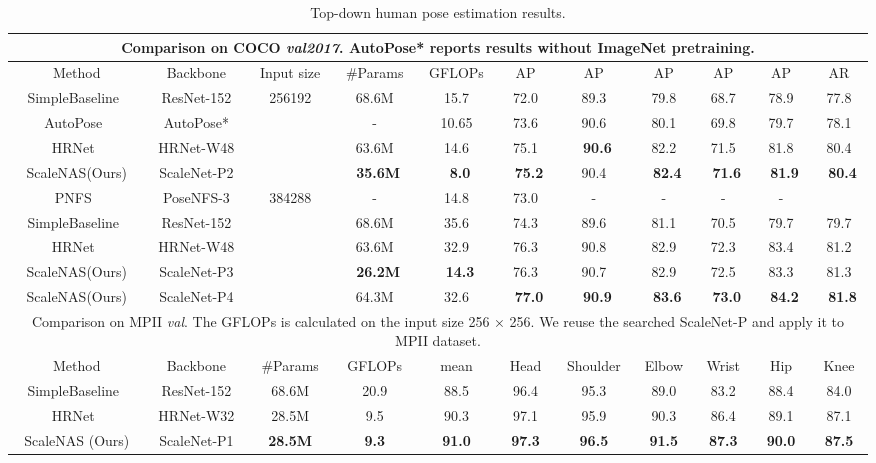 \documentclass[final]{cvpr}
\newcommand{\workname}{ScaleNAS\xspace}
\newcommand{\netname}{ScaleNet\xspace}
\begin{document}
\begin{table*}
\centering
\caption{Top-down human pose estimation results.
}
\small
\begin{tabular}{c||c|c|c|c|c|c|c|c|c|c} 
\hline
\multicolumn{11}{c}{\footnotesize{Comparison on COCO \textit{val2017}. AutoPose* reports results without ImageNet pretraining.}} \\
\hline
Method & Backbone & Input size  & \#Params & GFLOPs & AP & AP  & AP  & AP  & AP  & AR \\ 
\hline 
SimpleBaseline~\cite{xiao2018simple}  & ResNet-152       & \multirow{4}{*}{256192} & 68.6M    & 15.7   & 72.0 & 89.3      & 79.8      & 68.7     & 78.9     & 77.8 \\
AutoPose~\cite{gong2020autopose}   & AutoPose*       &  & -    & 10.65   & 73.6 & 90.6      & 80.1      & 69.8     & 79.7     & 78.1 \\
HRNet~\cite{wang2020deep}           & HRNet-W48        &  & 63.6M    & 14.6   & 75.1 & ~\textbf{90.6}      & 82.2      & 71.5     & 81.8     & 80.4 \\
\workname(Ours) & \netname-P2  &  & ~\textbf{35.6M}    & ~\textbf{8.0}    & ~\textbf{75.2} & 90.4      & ~\textbf{82.4}      & ~\textbf{71.6}     & ~\textbf{81.9}     & ~\textbf{80.4} \\
\hline
PNFS~\cite{yang2019pose}   & PoseNFS-3       & \multirow{5}{*}{384288} & -    & 14.8    & 73.0 & -      & -      & -     & -    &  \\
SimpleBaseline~\cite{xiao2018simple}  & ResNet-152       &  & 68.6M    & 35.6   & 74.3 & 89.6      & 81.1      & 70.5     & 79.7     & 79.7 \\
HRNet~\cite{wang2020deep}          & HRNet-W48        &   & 63.6M    & 32.9   & 76.3 & 90.8      & 82.9      & 72.3     & 83.4     & 81.2 \\
\workname(Ours) & \netname-P3  &  & ~\textbf{26.2M}    & ~\textbf{14.3}   & 76.3 & 90.7      & 82.9      & 72.5     & 83.3     & 81.3  \\
\workname(Ours) & \netname-P4 &  & 64.3M    & 32.6   & ~\textbf{77.0} & ~\textbf{90.9}      & ~\textbf{83.6}      & ~\textbf{73.0}     & ~\textbf{84.2}     & ~\textbf{81.8}  \\
\hline
\hline
\multicolumn{11}{c}{\footnotesize{Comparison on MPII \textit{val}. The GFLOPs is calculated on the input size 256 × 256. We reuse the searched \netname-P and apply it to MPII dataset.}} \\
\hline
Method  & Backbone & \#Params & GFLOPs  & mean &Head & Shoulder & Elbow &  Wrist & Hip & Knee     \\ 
\hline 
SimpleBaseline~\cite{xiao2018simple} & ResNet-152 & 68.6M & 20.9 & 88.5 & 96.4 & 95.3  & 89.0  & 83.2 & 88.4 & 84.0\\
HRNet~\cite{wang2020deep} & HRNet-W32 & 28.5M &  9.5 & 90.3 & 97.1 & 95.9 & 90.3 & 86.4 & 89.1 & 87.1\\
ScaleNAS (Ours) & \netname-P1 &  \textbf{28.5M} & \textbf{9.3} &\textbf{91.0} & \textbf{97.3}  & \textbf{96.5} & \textbf{91.5} & \textbf{87.3} & \textbf{90.0} & \textbf{87.5} \\


\end{tabular}
\end{table*}
\end{document}
